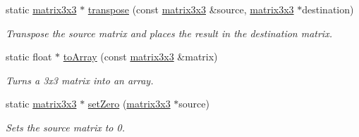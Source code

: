 \begin{DoxyCompactItemize}
static \hyperlink{classflounder_1_1matrix3x3}{matrix3x3} $\ast$ \hyperlink{classflounder_1_1matrix3x3_ab29360c43ea7f2dbc9cd3a56cd68fc17}{transpose} (const \hyperlink{classflounder_1_1matrix3x3}{matrix3x3} \&source, \hyperlink{classflounder_1_1matrix3x3}{matrix3x3} $\ast$destination)
\begin{DoxyCompactList}\small\item\em Transpose the source matrix and places the result in the destination matrix. \end{DoxyCompactList}\item 
static float $\ast$ \hyperlink{classflounder_1_1matrix3x3_ae8e1750d62bd1061ae0e39e26794b23b}{to\+Array} (const \hyperlink{classflounder_1_1matrix3x3}{matrix3x3} \&matrix)
\begin{DoxyCompactList}\small\item\em Turns a 3x3 matrix into an array. \end{DoxyCompactList}\item 
static \hyperlink{classflounder_1_1matrix3x3}{matrix3x3} $\ast$ \hyperlink{classflounder_1_1matrix3x3_abfa43745d8f828a4751dc727c3186546}{set\+Zero} (\hyperlink{classflounder_1_1matrix3x3}{matrix3x3} $\ast$source)
\begin{DoxyCompactList}\small\item\em Sets the source matrix to 0. \end{DoxyCompactList}\end{DoxyCompactItemize}
